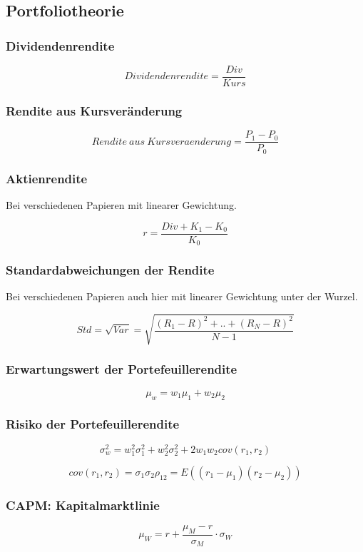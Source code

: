 \subsection{Portfoliotheorie}

\subsubsection{Dividendenrendite}
\[Dividendenrendite = \frac{Div}{Kurs}\]

\subsubsection{Rendite aus Kursveränderung}
\[Rendite~aus~Kursveraenderung = \frac{P_1-P_0}{P_0}\]

\subsubsection{Aktienrendite}
Bei verschiedenen Papieren mit linearer Gewichtung.

\[r = \frac{Div + K_1 - K_0}{K_0}\]

\subsubsection{Standardabweichungen der Rendite}
Bei verschiedenen Papieren auch hier mit linearer Gewichtung unter der Wurzel.

\[Std = \sqrt{Var} = \sqrt{\frac{(R_1-R)^2+..+(R_N-R)^2}{N-1}}\]

\subsubsection{Erwartungswert der Portefeuillerendite}
\[\mu_w = w_1\mu_1 + w_2\mu_2\]

\subsubsection{Risiko der Portefeuillerendite}
\[\sigma^2_w = w^2_1\sigma^2_1+w^2_2\sigma^2_2+2w_1w_2cov(r_1,r_2)\]

\[cov(r_1,r_2) = \sigma_1\sigma_2\rho_{12} = E((r_1-\mu_1)(r_2-\mu_2))\]

\subsubsection{CAPM: Kapitalmarktlinie}
\[\mu_W = r + \frac{\mu_M-r}{\sigma_M}\cdot\sigma_W\]

